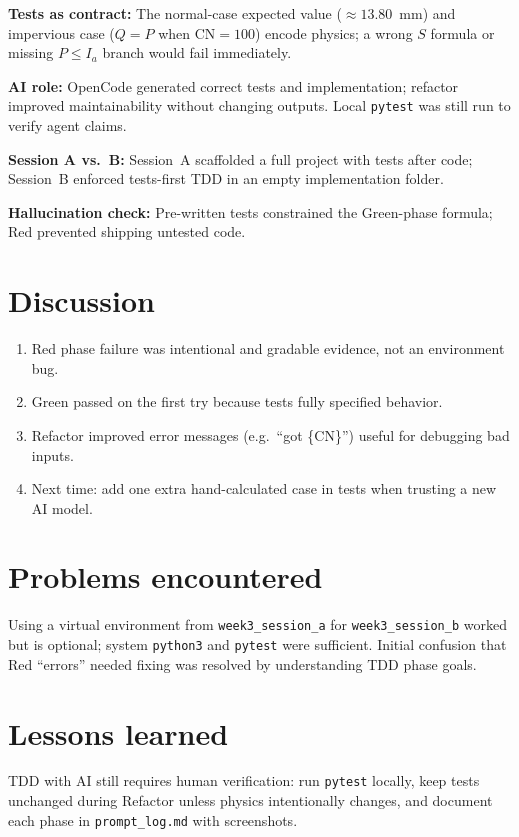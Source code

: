 \documentclass[11pt,a4paper]{article}
\begin{document}
\textbf{Tests as contract:} The normal-case expected value ($\approx 13.80$~mm) and impervious case ($Q=P$ when $\mathrm{CN}=100$) encode physics; a wrong $S$ formula or missing $P \le I_a$ branch would fail immediately.

\textbf{AI role:} OpenCode generated correct tests and implementation; refactor improved maintainability without changing outputs. Local \texttt{pytest} was still run to verify agent claims.

\textbf{Session A vs.\ B:} Session~A scaffolded a full project with tests after code; Session~B enforced tests-first TDD in an empty implementation folder.

\textbf{Hallucination check:} Pre-written tests constrained the Green-phase formula; Red prevented shipping untested code.

\section{Discussion}
\begin{enumerate}[noitemsep]
  \item Red phase failure was intentional and gradable evidence, not an environment bug.
  \item Green passed on the first try because tests fully specified behavior.
  \item Refactor improved error messages (e.g.\ ``got \{CN\}'') useful for debugging bad inputs.
  \item Next time: add one extra hand-calculated case in tests when trusting a new AI model.
\end{enumerate}

\section{Problems encountered}
Using a virtual environment from \texttt{week3\_session\_a} for \texttt{week3\_session\_b} worked but is optional; system \texttt{python3} and \texttt{pytest} were sufficient. Initial confusion that Red ``errors'' needed fixing was resolved by understanding TDD phase goals.

\section{Lessons learned}
TDD with AI still requires human verification: run \texttt{pytest} locally, keep tests unchanged during Refactor unless physics intentionally changes, and document each phase in \texttt{prompt\_log.md} with screenshots.
\end{document}
